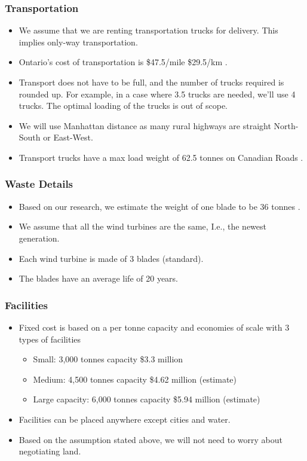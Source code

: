 \subsubsection{Transportation}
\begin{itemize}[noitemsep]
  \item We assume that we are renting transportation trucks for delivery. This implies only-way transportation. 
  \item Ontario's cost of transportation is \$47.5/mile \$29.5/km \cite{RN5}.  
  \item Transport does not have to be full, and the number of trucks required is rounded up.  For example, in a case where 3.5 trucks are needed, we’ll use 4 trucks. The optimal loading of the trucks is out of scope. 
  \item We will use Manhattan distance as many rural highways are straight North-South or East-West. 
  \item Transport trucks have a max load weight of 62.5 tonnes on Canadian Roads \cite{RN6}.
\end{itemize}

\subsubsection{Waste Details}
\begin{itemize}[noitemsep]
  \item Based on our research, we estimate the weight of one blade to be 36 tonnes \cite{RN7} \cite{RN8}.
  \item We assume that all the wind turbines are the same, I.e., the newest generation. 
  \item Each wind turbine is made of 3 blades (standard).  
  \item The blades have an average life of 20 years.
\end{itemize}

\subsubsection{Facilities}
\begin{itemize}[noitemsep]
    \item Fixed cost is based on a per tonne capacity and economies of scale with 3 types of facilities \cite{RN9} \cite{RN13}
    \begin{itemize}[noitemsep]
        \item Small: 3,000 tonnes capacity \$3.3 million 
        \item Medium: 4,500 tonnes capacity \$4.62 million (estimate) 
        \item Large capacity: 6,000 tonnes capacity \$5.94 million (estimate) 
    \end{itemize}
    \item Facilities can be placed anywhere except cities and water.  
    \item Based on the assumption stated above, we will not need to worry about negotiating land.
\end{itemize}    
